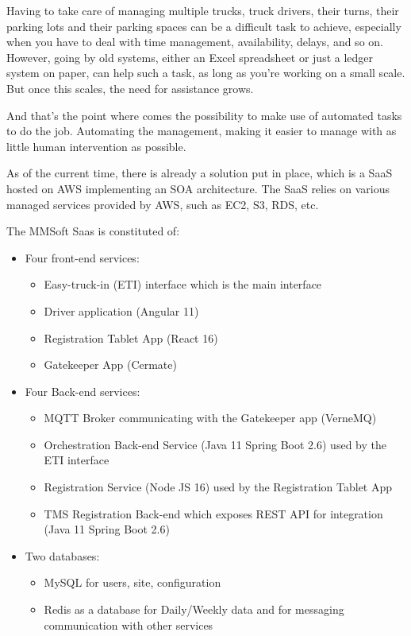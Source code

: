 Having to take care of managing multiple trucks, truck drivers, their turns, their parking lots
and their parking spaces can be a difficult task to achieve, especially when you have to deal with
time management, availability, delays, and so on.
However, going by old systems, either an Excel spreadsheet or just a ledger system on
paper, can help such a task, as long as you're working on a small scale. But once
this scales, the need for assistance grows.

And that's the point where comes the possibility to make use of automated tasks to do the job.
Automating the management, making it easier to manage with as little human intervention
as possible.

As of the current time, there is already a solution put in place, which is a SaaS hosted
on AWS implementing an SOA architecture. The SaaS relies on various managed services
provided by AWS, such as EC2, S3, RDS, etc.

The MMSoft Saas is constituted of:
\begin{itemize}
    \item Four front-end services:
    \begin{itemize}
        \item Easy-truck-in (ETI) interface which is the main interface
        \item Driver application (Angular 11)
        \item Registration Tablet App (React 16)
        \item Gatekeeper App (Cermate)
    \end{itemize}
    \item Four Back-end services:
    \begin{itemize}
        \item MQTT Broker communicating with the Gatekeeper app (VerneMQ)
        \item Orchestration Back-end Service (Java 11 Spring Boot 2.6) used by the ETI interface
        \item Registration Service (Node JS 16) used by the Registration Tablet App
        \item TMS Registration Back-end which exposes REST API for integration (Java 11 Spring Boot 2.6)
    \end{itemize}
    \item Two databases:
    \begin{itemize}
        \item MySQL for users, site, configuration
        \item Redis as a database for Daily/Weekly data and for messaging communication with other services
    \end{itemize}
\end{itemize}


